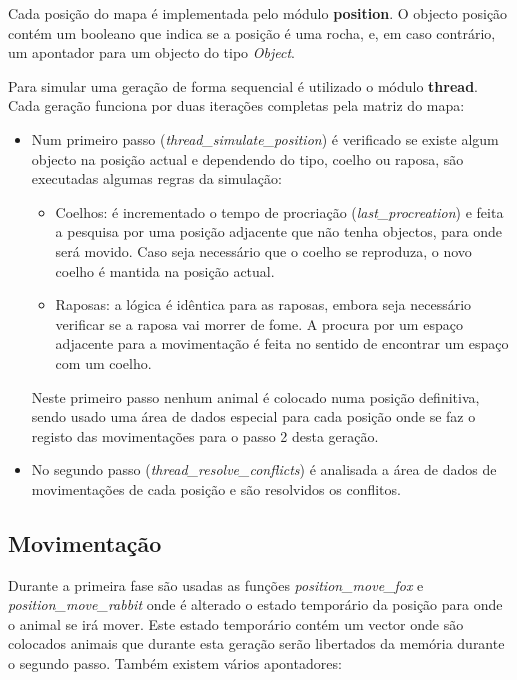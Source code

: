 \documentclass[12pt]{article}
\begin{document}
Cada posição do mapa é implementada pelo módulo \textbf{position}. O objecto posição contém
um booleano que indica se a posição é uma rocha, e, em caso contrário, um apontador para um objecto do tipo \textit{Object}.

Para simular uma geração de forma sequencial é utilizado o módulo \textbf{thread}. Cada geração
funciona por duas iterações completas pela matriz do mapa:

\begin{itemize}
  \item Num primeiro passo (\textit{thread\_simulate\_position}) é verificado se existe algum objecto
  na posição actual e dependendo do tipo, coelho ou raposa, são executadas algumas regras da simulação:
    \begin{itemize}
      \item Coelhos: é incrementado o tempo de procriação (\textit{last\_procreation}) e feita a pesquisa por uma posição
        adjacente que não tenha objectos, para onde será movido.
        Caso seja necessário que o coelho se reproduza, o novo coelho é mantida na posição
        actual.
      \item Raposas: a lógica é idêntica para as raposas, embora seja necessário verificar se a raposa vai morrer de fome.
       A procura por um espaço adjacente para a movimentação é feita no sentido de encontrar um espaço com um coelho.
    \end{itemize}
    Neste primeiro passo nenhum animal é colocado numa posição definitiva, sendo usado uma área de dados
    especial para cada posição onde se faz o registo das movimentações para o passo 2 desta geração.
  \item No segundo passo (\textit{thread\_resolve\_conflicts}) é analisada a área de dados de movimentações de cada posição e são resolvidos os conflitos.
\end{itemize}

\subsection{Movimentação}

Durante a primeira fase são usadas as funções \textit{position\_move\_fox} e \textit{position\_move\_rabbit}
onde é alterado o estado temporário da posição para onde o animal se irá mover. Este estado temporário
contém um vector onde são colocados animais que durante esta geração serão libertados da memória durante
o segundo passo. Também existem vários apontadores:
\end{document}
